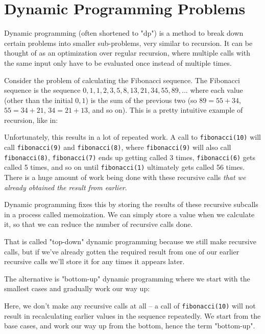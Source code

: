 \section{Dynamic Programming Problems}

Dynamic programming (often shortened to "dp") is a method to break down certain problems into smaller sub-problems, very similar to recursion. It can be thought of as an optimization over regular recursion, where multiple calls with the same input only have to be evaluated once instead of multiple times.

Consider the problem of calculating the Fibonacci sequence. The Fibonacci sequence is the sequence $0,1,1,2,3,5,8,13,21,34,55,89,...$ where each value (other than the initial $0,1$) is the sum of the previous two (so $89 = 55 + 34$, $55 = 34 + 21$, $34 = 21 + 13$, and so on). This is a pretty intuitive example of recursion, like in:


Unfortunately, this results in a lot of repeated work. A call to \texttt{fibonacci(10)} will call \texttt{fibonacci(9)} and \texttt{fibonacci(8)}, where \texttt{fibonacci(9)} will also call \texttt{fibonacci(8)}, \texttt{fibonacci(7)} ends up getting called 3 times, \texttt{fibonacci(6)} gets called 5 times, and so on until \texttt{fibonacci(1)} ultimately gets called 56 times. There is a huge amount of work being done with these recursive calls \textit{that we already obtained the result from earlier}.

Dynamic programming fixes this by storing the results of these recursive subcalls in a process called memoization. We can simply store a value when we calculate it, so that we can reduce the number of recursive calls done.


That is called "top-down" dynamic programming because we still make recursive calls, but if we've already gotten the required result from one of our earlier recursive calls we'll store it for any times it appears later.

The alternative is "bottom-up" dynamic programming where we start with the smallest cases and gradually work our way up:


Here, we don't make any recursive calls at all -- a call of \texttt{fibonacci(10)} will not result in recalculating earlier values in the sequence repeatedly. We start from the base cases, and work our way up from the bottom, hence the term "bottom-up".

